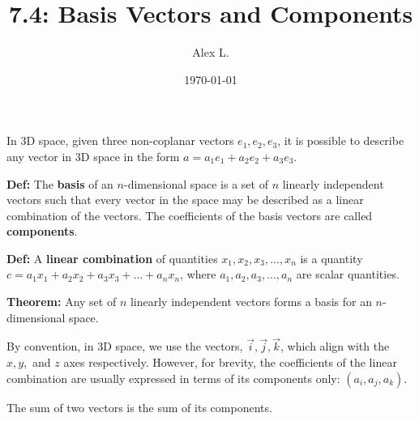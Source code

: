 \documentclass{article}
\title{7.4: Basis Vectors and Components}
\author{Alex L.}
\date{\today}
\begin{document}
\maketitle

In 3D space, given three non-coplanar vectors $e_1, e_2, e_3$, it is possible to describe any vector in 3D space in the form $a = a_1e_1 + a_2e_2 + a_3e_3$.

\textbf{Def:} The \textbf{basis} of an $n$-dimensional space is a set of $n$ linearly independent vectors such that every vector in the space may be described as a linear combination of the vectors. The coefficients of the basis vectors are called \textbf{components}. 

\textbf{Def:} A \textbf{linear combination} of quantities $x_1, x_2, x_3, ... ,x_n$ is a quantity $c = a_1x_1 + a_2x_2 + a_3x_3 + ... + a_nx_n$, where $a_1, a_2, a_3, ... , a_n$ are scalar quantities.  

\textbf{Theorem:} Any set of $n$ linearly independent vectors forms a basis for an $n$-dimensional space. 

By convention, in 3D space, we use the vectors, $\vec{i}, \vec{j}, \vec{k}$, which align with the $x,y,$ and $z$ axes respectively. However, for brevity, the coefficients of the linear combination are usually expressed in terms of its components only: $(a_i, a_j, a_k)$. 

The sum of two vectors is the sum of its components.
\end{document}
